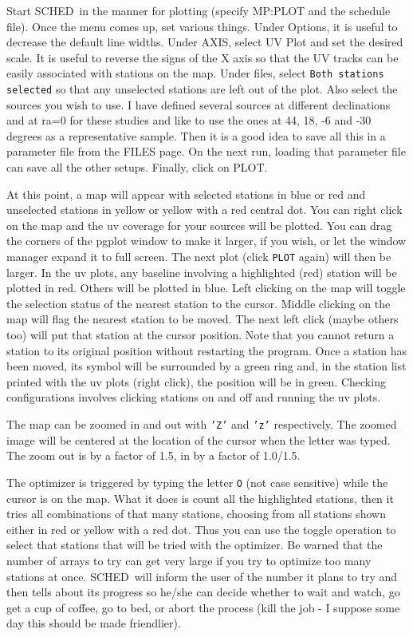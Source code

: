 \documentclass{report}
\newcommand{\schedb}{{\sc SCHED~}}
\begin{document}
Start \schedb in the manner for plotting (specify 
{MP:PLOT} and the schedule file).  Once the menu comes up, set various
things.  Under Options, it is useful to decrease the default line
widths.  Under AXIS, select UV Plot and set the desired scale.  It
is useful to reverse the signs of the X axis so that the UV tracks
can be easily associated with stations on the map.  Under files,
select {\tt Both stations selected} so that any unselected stations
are left out of the plot.  Also select the sources you wish to use.
I have defined several sources at different declinations and at ra=0
for these studies and like to use the ones at 44, 18, -6 and -30 degrees
as a representative sample.  Then it is a good idea to save all this in
a parameter file from the FILES page.  On the next run, loading that
parameter file can save all the other setups.  Finally, click on PLOT.

At this point, a map will appear with selected stations in blue or red
and unselected stations in yellow or yellow with a red central dot.
You can right click on the map and the uv coverage for your sources
will be plotted.  You can drag the corners of the pgplot window to
make it larger, if you wish, or let the window manager expand it to
full screen.  The next plot (click {\tt PLOT} again) will then be
larger.  In the uv plots, any baseline involving a highlighted (red)
station will be plotted in red.  Others will be plotted in blue.  Left
clicking on the map will toggle the selection status of the nearest
station to the cursor.  Middle clicking on the map will flag the
nearest station to be moved.  The next left click (maybe others too)
will put that station at the cursor position.  Note that you cannot
return a station to its original position without restarting the
program.  Once a station has been moved, its symbol will be surrounded
by a green ring and, in the station list printed with the uv plots
(right click), the position will be in green.  Checking configurations
involves clicking stations on and off and running the uv plots.

The map can be zoomed in and out with {\tt 'Z'} and {\tt 'z'}
respectively.  The zoomed image will be centered at the location
of the cursor when the letter was typed.  The zoom out is by
a factor of 1.5, in by a factor of 1.0/1.5.

The optimizer is triggered by typing the letter {\tt O} (not case
sensitive) while the cursor is on the map.  What it does is count all
the highlighted stations, then it tries all combinations of that many
stations, choosing from all stations shown either in red or yellow
with a red dot.  Thus you can use the toggle operation to select that
stations that will be tried with the optimizer.  Be warned that the
number of arrays to try can get very large if you try to optimize too
many stations at once.  \schedb will inform the user of the number it
plans to try and then tells about its progress so he/she can decide
whether to wait and watch, go get a cup of coffee, go to bed, or abort
the process (kill the job - I suppose some day this should be made
friendlier).
\end{document}
